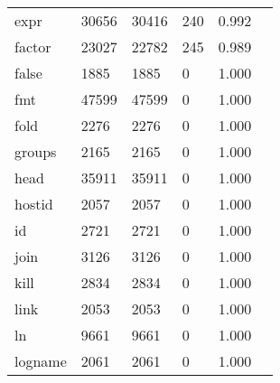 \begin{longtable}{lp{2.4cm}p{2.4cm}p{2.4cm}p{2.4cm}p{2.4cm}}
expr      &                                   30656 &                       30416 &                          240 &                                   0.992 \\
factor    &                                   23027 &                       22782 &                          245 &                                   0.989 \\
false     &                                    1885 &                        1885 &                            0 &                                   1.000 \\
fmt       &                                   47599 &                       47599 &                            0 &                                   1.000 \\
fold      &                                    2276 &                        2276 &                            0 &                                   1.000 \\
groups    &                                    2165 &                        2165 &                            0 &                                   1.000 \\
head      &                                   35911 &                       35911 &                            0 &                                   1.000 \\
hostid    &                                    2057 &                        2057 &                            0 &                                   1.000 \\
id        &                                    2721 &                        2721 &                            0 &                                   1.000 \\
join      &                                    3126 &                        3126 &                            0 &                                   1.000 \\
kill      &                                    2834 &                        2834 &                            0 &                                   1.000 \\
link      &                                    2053 &                        2053 &                            0 &                                   1.000 \\
ln        &                                    9661 &                        9661 &                            0 &                                   1.000 \\
logname   &                                    2061 &                        2061 &                            0 &                                   1.000 \\

\end{longtable}
